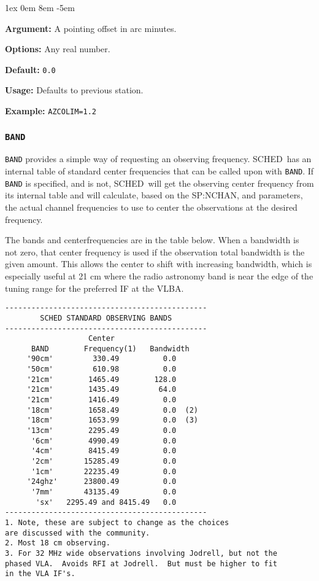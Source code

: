 \documentclass{report}
\newcommand{\schedb}{{\sc SCHED~}}
\newcommand{\rcwbox}[5]{
  \begin{list}{}{\parsep 1ex  \itemsep 0em
                 \leftmargin 8em  \itemindent -5em }
    \item {\bf Argument:} #1
    \item {\bf Options:}  #2
    \item {\bf Default:}  #3
    \item {\bf Usage:}    #4
    \item {\bf Example:}  #5
  \end{list}
}
\begin{document}
\rcwbox
{A pointing offset in arc minutes.}
{Any real number.}
{{\tt 0.0}}
{Defaults to previous station.}
{{\tt AZCOLIM=1.2}}


\subsubsection{\label{SP:BAND}{\tt BAND}}

{\tt BAND} provides a simple way of requesting an observing frequency.
\schedb has an internal table of standard center frequencies that can
be called upon with {\tt BAND}.  If {\tt BAND} is specified, and
 is not, \schedb will get the
observing center frequency from its internal table and will calculate,
based on the  {SP:NCHAN},  and  parameters,
the actual channel frequencies to use to center the observations at
the desired frequency.

The bands and centerfrequencies are in the table below.  When a
bandwidth is not zero, that center frequency is used if the
observation total bandwidth is the given amount.  This allows
the center to shift with increasing bandwidth, which is especially
useful at 21 cm where the radio astronomy band is near the edge
of the tuning range for the preferred IF at the VLBA.

\begin{verbatim}
----------------------------------------------
        SCHED STANDARD OBSERVING BANDS
----------------------------------------------
                   Center
      BAND        Frequency(1)   Bandwidth
     '90cm'         330.49          0.0
     '50cm'         610.98          0.0
     '21cm'        1465.49        128.0
     '21cm'        1435.49         64.0
     '21cm'        1416.49          0.0
     '18cm'        1658.49          0.0  (2)
     '18cm'        1653.99          0.0  (3)
     '13cm'        2295.49          0.0
      '6cm'        4990.49          0.0
      '4cm'        8415.49          0.0
      '2cm'       15285.49          0.0
      '1cm'       22235.49          0.0
     '24ghz'      23800.49          0.0
      '7mm'       43135.49          0.0
       'sx'   2295.49 and 8415.49   0.0
----------------------------------------------
1. Note, these are subject to change as the choices
are discussed with the community.
2. Most 18 cm observing.
3. For 32 MHz wide observations involving Jodrell, but not the
phased VLA.  Avoids RFI at Jodrell.  But must be higher to fit
in the VLA IF's.
\end{verbatim}
\end{document}
